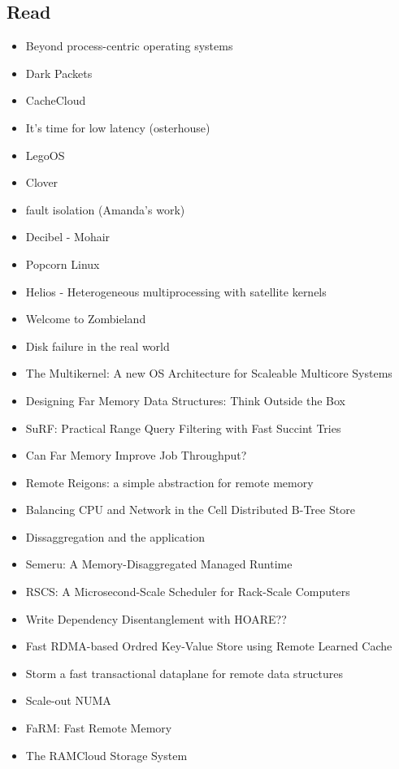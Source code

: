 \subsection{Read}
\begin{itemize}
    \item{Beyond process-centric operating systems}~\cite{189914}\rpaper{}
    \item{Dark Packets}\rabstract{}
    \item{CacheCloud}~\cite{cachecloud}\rintro{+}
    \item{It's time for low latency (osterhouse)}
    \item{LegoOS}\cite{legoos}\rpaper{}
    \item {Clover}\cite{clover}\rpaper{}
    \item{fault isolation (Amanda's work)}\rintro{}
    \item{Decibel - Mohair}\rabstract{}
    \item{Popcorn Linux}
    \item{Helios - Heterogeneous multiprocessing with satellite kernels}~\cite{helios}\rabstract{}
    \item{Welcome to Zombieland}~\cite{zombieland}\rintro{}
    \item{Disk failure in the real world}~\cite{Schroeder:2007:DFR:1267903.1267904}\rabstract{}
    \item{The Multikernel: A new OS Architecture for Scaleable
        Multicore Systems}~\cite{the-multikenel}\rabstract{}
    \item{Designing Far Memory Data Structures: Think Outside the Box}~\cite{aguilera2019designing}
    \item{SuRF: Practical Range Query Filtering with Fast Succint Tries}~\cite{surf}\rabstract{}
    \item{Can Far Memory Improve Job Throughput?}~\cite{10.1145/3342195.3387522}
    \item{Remote Reigons: a simple abstraction for remote memory}~\cite{215933}
    \item{Balancing CPU and Network in the Cell Distributed B-Tree Store}~\cite{cell}
    \item{Dissaggregation and the application}~\cite{254120}
    \item{Semeru: A Memory-Disaggregated Managed Runtime}
    \item{RSCS: A Microsecond-Scale Scheduler for Rack-Scale Computers}
    \item{Write Dependency Disentanglement with HOARE??}
    \item{Fast RDMA-based Ordred Key-Value Store using Remote Learned Cache}
    \item{Storm a fast transactional dataplane for remote data
        structures}~\cite{storm}
    \item{Scale-out NUMA}~\cite{sonuma}
    \item{FaRM: Fast Remote Memory}~\cite{farm}
    \item{The RAMCloud Storage System}~\cite{ramcloud}


\end{itemize}

